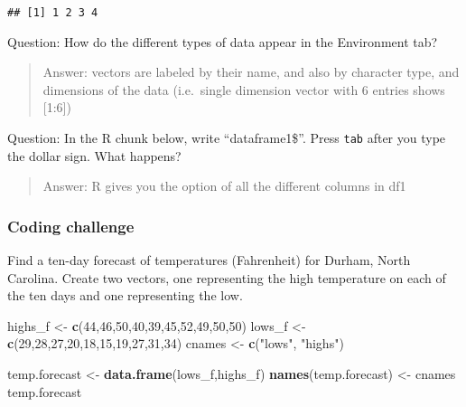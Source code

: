 \documentclass[
]{article}
\newenvironment{Shaded}{\begin{snugshade}}{\end{snugshade}}
\newcommand{\CommentTok}[1]{\textcolor[rgb]{0.56,0.35,0.01}{\textit{#1}}}
\newcommand{\DecValTok}[1]{\textcolor[rgb]{0.00,0.00,0.81}{#1}}
\newcommand{\KeywordTok}[1]{\textcolor[rgb]{0.13,0.29,0.53}{\textbf{#1}}}
\newcommand{\NormalTok}[1]{#1}
\newcommand{\OperatorTok}[1]{\textcolor[rgb]{0.81,0.36,0.00}{\textbf{#1}}}
\newcommand{\StringTok}[1]{\textcolor[rgb]{0.31,0.60,0.02}{#1}}
\begin{document}
\begin{Shaded}
\end{Shaded}

\begin{verbatim}
## [1] 1 2 3 4
\end{verbatim}

Question: How do the different types of data appear in the Environment
tab?

\begin{quote}
Answer: vectors are labeled by their name, and also by character type,
and dimensions of the data (i.e.~single dimension vector with 6 entries
shows {[}1:6{]})
\end{quote}

Question: In the R chunk below, write ``dataframe1\$''. Press
\texttt{tab} after you type the dollar sign. What happens?

\begin{quote}
Answer: R gives you the option of all the different columns in df1
\end{quote}

\hypertarget{coding-challenge}{%
\subsubsection{Coding challenge}\label{coding-challenge}}

Find a ten-day forecast of temperatures (Fahrenheit) for Durham, North
Carolina. Create two vectors, one representing the high temperature on
each of the ten days and one representing the low.

\begin{Shaded}
\begin{Highlighting}[]
\NormalTok{highs_f <-}\StringTok{ }\KeywordTok{c}\NormalTok{(}\DecValTok{44}\NormalTok{,}\DecValTok{46}\NormalTok{,}\DecValTok{50}\NormalTok{,}\DecValTok{40}\NormalTok{,}\DecValTok{39}\NormalTok{,}\DecValTok{45}\NormalTok{,}\DecValTok{52}\NormalTok{,}\DecValTok{49}\NormalTok{,}\DecValTok{50}\NormalTok{,}\DecValTok{50}\NormalTok{)}
\NormalTok{lows_f <-}\StringTok{ }\KeywordTok{c}\NormalTok{(}\DecValTok{29}\NormalTok{,}\DecValTok{28}\NormalTok{,}\DecValTok{27}\NormalTok{,}\DecValTok{20}\NormalTok{,}\DecValTok{18}\NormalTok{,}\DecValTok{15}\NormalTok{,}\DecValTok{19}\NormalTok{,}\DecValTok{27}\NormalTok{,}\DecValTok{31}\NormalTok{,}\DecValTok{34}\NormalTok{)}
\NormalTok{cnames <-}\StringTok{ }\KeywordTok{c}\NormalTok{(}\StringTok{"lows"}\NormalTok{, }\StringTok{"highs"}\NormalTok{)}

\NormalTok{temp.forecast <-}\StringTok{ }\KeywordTok{data.frame}\NormalTok{(lows_f,highs_f)}
\KeywordTok{names}\NormalTok{(temp.forecast) <-}\StringTok{ }\NormalTok{cnames}
\NormalTok{temp.forecast}
\end{Highlighting}
\end{Shaded}
\end{document}
